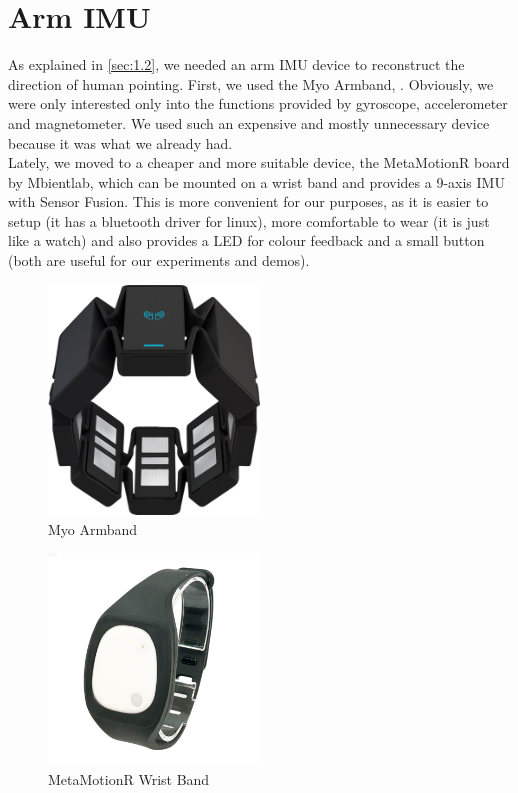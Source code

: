 \section{Arm IMU}
As explained in \ref{sec:1.2}, we needed an arm IMU device to reconstruct the direction of human pointing. First, we used the Myo Armband, . Obviously, we were only interested only into the functions provided by gyroscope, accelerometer and magnetometer. We used such an expensive and mostly unnecessary device because it was what we already had.\\ Lately, we moved to a cheaper and more suitable device, the MetaMotionR board by Mbientlab, which can be mounted on a wrist band and provides a 9-axis IMU with Sensor Fusion. This is more convenient for our purposes, as it is easier to setup (it has a bluetooth driver for linux), more comfortable to wear (it is just like a watch) and also provides a LED for colour feedback and a small button (both are useful for our experiments and demos).
\begin{figure}
	\centering
	\includegraphics[width=0.5\textwidth]{img/myo.png}%
	\caption{Myo Armband}
	\label{fig:myo}
\end{figure}
\begin{figure}
	\centering
	\includegraphics[width=0.5\textwidth]{img/rwristband.png}%
	\caption{MetaMotionR Wrist Band}
	\label{fig:rwristband}
\end{figure}
